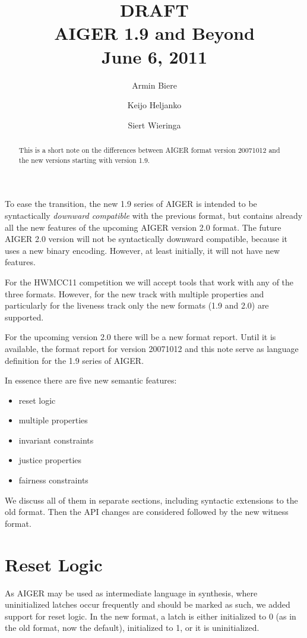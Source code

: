 \documentclass{llncs}
\title{
{\color{blue}\large DRAFT}\\
  AIGER 1.9 and Beyond \\
{\color{blue}\large June 6, 2011}}
\author{Armin Biere\inst{1} \and
Keijo Heljanko\inst{2} \and
Siert Wieringa\inst{2}}
\institute{Johannes Kepler University, Austria \and Aalto University, Finland}
\begin{document}
\maketitle
\begin{abstract}
This is a short note on the differences between AIGER format version 20071012
and the new versions starting with version 1.9.
\end{abstract}
To ease the transition, the new 1.9 series of AIGER is intended to be
syntactically \emph{downward compatible} with the previous format, but contains
already all the new features of the upcoming AIGER version 2.0 format.  The
future AIGER 2.0 version will not be syntactically downward compatible, because
it uses a new binary encoding.  However, at least initially, it will not have
new features.

For the HWMCC11 competition we will accept tools that work with any of
the three formats.  However, for the new track with multiple properties and 
particularly for the liveness track only the new formats (1.9 and 2.0) are
supported.

For the upcoming version 2.0 there will be a new format report. Until it is
available, the format report for version 20071012 and this note serve as
language definition for the 1.9 series of AIGER.  

In essence there are five new semantic features:

\begin{itemize}
\item reset logic
\item multiple properties
\item invariant constraints
\item justice properties
\item fairness constraints
\end{itemize}

We discuss all of them in separate sections, including syntactic
extensions to the old format.   Then the API changes are considered followed
by the new witness format.

\section{Reset Logic}

As AIGER may be used as intermediate language in synthesis, where
uninitialized latches occur frequently and should be marked as such, we
added support for reset logic.  In the new format, a latch is either
initialized to 0 (as in the old format, now the default), initialized to 1,
or it is uninitialized.
\end{document}
